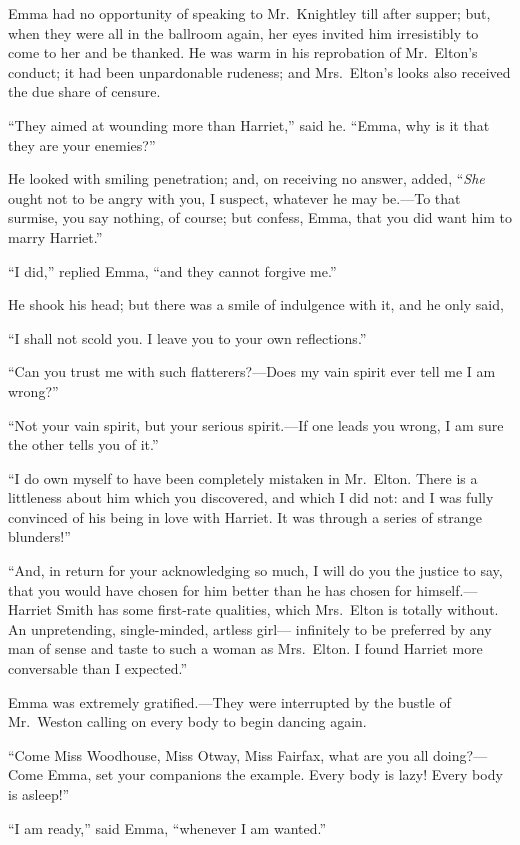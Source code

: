 Emma had no opportunity of speaking to Mr.\ Knightley till
after supper; but, when they were all in the ballroom again,
her eyes invited him irresistibly to come to her and be thanked.
He was warm in his reprobation of Mr.\ Elton's conduct; it had been
unpardonable rudeness; and Mrs.\ Elton's looks also received the due
share of censure.

``They aimed at wounding more than Harriet,'' said he.  ``Emma, why
is it that they are your enemies?''

He looked with smiling penetration; and, on receiving
no answer, added, ``\emph{She} ought not to be angry with you, I suspect,
whatever he may be.---To that surmise, you say nothing, of course;
but confess, Emma, that you did want him to marry Harriet.''

``I did,'' replied Emma, ``and they cannot forgive me.''

He shook his head; but there was a smile of indulgence with it,
and he only said,

``I shall not scold you.  I leave you to your own reflections.''

``Can you trust me with such flatterers?---Does my vain spirit ever
tell me I am wrong?''

``Not your vain spirit, but your serious spirit.---If one leads
you wrong, I am sure the other tells you of it.''

``I do own myself to have been completely mistaken in Mr.\ Elton.
There is a littleness about him which you discovered, and which I
did not:  and I was fully convinced of his being in love with Harriet.
It was through a series of strange blunders!''

``And, in return for your acknowledging so much, I will do you the justice
to say, that you would have chosen for him better than he has chosen for
himself.---Harriet Smith has some first-rate qualities, which Mrs.\ Elton
is totally without.  An unpretending, single-minded, artless girl---%
infinitely to be preferred by any man of sense and taste to such
a woman as Mrs.\ Elton.  I found Harriet more conversable than I expected.''

Emma was extremely gratified.---They were interrupted by the bustle
of Mr.\ Weston calling on every body to begin dancing again.

``Come Miss Woodhouse, Miss Otway, Miss Fairfax, what are you all doing?---%
Come Emma, set your companions the example.  Every body is lazy!
Every body is asleep!''

``I am ready,'' said Emma, ``whenever I am wanted.''


